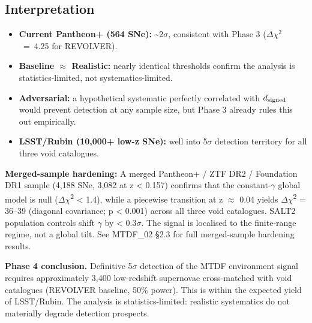 \documentclass[11pt,a4paper]{article}
\begin{document}
\subsection{Interpretation}
\begin{itemize}
  \item \textbf{Current Pantheon+ (564 SNe):} \~{}2$\sigma$, consistent with Phase 3 ($\Delta$$\chi$$^{2}$~=~4.25 for REVOLVER).
  \item \textbf{Baseline $\approx$ Realistic:} nearly identical thresholds confirm the analysis is statistics-limited, not systematics-limited.
  \item \textbf{Adversarial:} a hypothetical systematic perfectly correlated with \( d_{\rm signed} \) would prevent detection at any sample size, but Phase 3 already rules this out empirically.
  \item \textbf{LSST/\allowbreak{}Rubin (10,000+ low-z SNe):} well into 5$\sigma$ detection territory for all three void catalogues.
\end{itemize}

\begin{mdframed}[linecolor=accent,linewidth=0.5pt,backgroundcolor=callout-bg,leftline=true,rightline=true,topline=true,bottomline=true,innerleftmargin=8pt,innerrightmargin=8pt,innertopmargin=6pt,innerbottommargin=6pt]
\textbf{Merged-sample hardening:} A merged Pantheon+ / ZTF DR2 / Foundation DR1 sample (4,188 SNe, 3,082 at z < 0.157) confirms that the constant-$\gamma$ global model is null ($\Delta$$\chi$\textsuperscript{2} < 1.4), while a piecewise transition at z $\approx$ 0.04 yields $\Delta$$\chi$\textsuperscript{2} = 36--39 (diagonal covariance; p < 0.001) across all three void catalogues. SALT2 population controls shift $\gamma$ by < 0.3$\sigma$. The signal is localised to the finite-range regime, not a global tilt. See MTDF\_\allowbreak{}02 \S{}2.3 for full merged-sample hardening results.
\end{mdframed}

\begin{mdframed}[linecolor=accent,linewidth=0.5pt,backgroundcolor=callout-bg,leftline=true,rightline=true,topline=true,bottomline=true,innerleftmargin=8pt,innerrightmargin=8pt,innertopmargin=6pt,innerbottommargin=6pt]
\textbf{Phase 4 conclusion.}
Definitive 5$\sigma$ detection of the MTDF environment signal requires approximately 3,400 low-redshift supernovae cross-matched with void catalogues (REVOLVER baseline, 50\% power). This is within the expected yield of LSST/\allowbreak{}Rubin. The analysis is statistics-limited: realistic systematics do not materially degrade detection prospects.
\end{mdframed}
\end{document}
